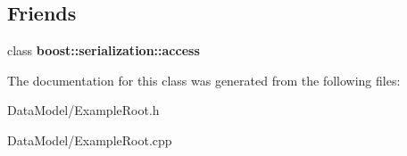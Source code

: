 \subsection*{Friends}
\begin{DoxyCompactItemize}
\item 
\hypertarget{classExampleRoot_ac98d07dd8f7b70e16ccb9a01abf56b9c}{class {\bfseries boost\-::serialization\-::access}}\label{classExampleRoot_ac98d07dd8f7b70e16ccb9a01abf56b9c}

\end{DoxyCompactItemize}


The documentation for this class was generated from the following files\-:\begin{DoxyCompactItemize}
\item 
Data\-Model/Example\-Root.\-h\item 
Data\-Model/Example\-Root.\-cpp\end{DoxyCompactItemize}
